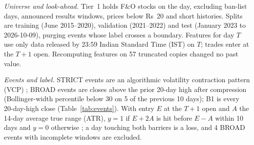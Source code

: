 \documentclass[conference]{IEEEtran}
\newcommand{\DataEnd}{2026-10-09}
\newcommand{\NGOneChecks}{57}
\newcommand{\IncompleteBroad}{4}
\begin{document}
\emph{Universe and look-ahead.} Tier~1 holds F\&O stocks on the day, excluding ban-list days, announced
results windows, prices below Rs~20 and short histories. Splits are training (June 2015--2020), validation
(2021--2022) and test (January 2023 to \DataEnd), purging events whose label crosses a boundary. Features for
day $T$ use only data released by 23:59 Indian Standard Time (IST) on $T$; trades enter at the $T+1$ open.
Recomputing features on \NGOneChecks{} truncated copies changed no past value.

\emph{Events and label.} STRICT events are an algorithmic volatility contraction pattern (VCP)
\cite{minervini2013}; BROAD events are closes above the prior 20-day high after compression (Bollinger-width
percentile below 30 on 5 of the previous 10 days); B1 is every 20-day-high close (Table~\ref{tab:events}).
With entry $E$ at the $T+1$ open and $A$ the 14-day average true range (ATR), $y=1$ if $E+2A$ is hit before
$E-A$ within 10 days and $y=0$ otherwise \cite{lopezdeprado2018}; a day touching both barriers is a loss, and
\IncompleteBroad{} BROAD events with incomplete windows are excluded.
\end{document}
